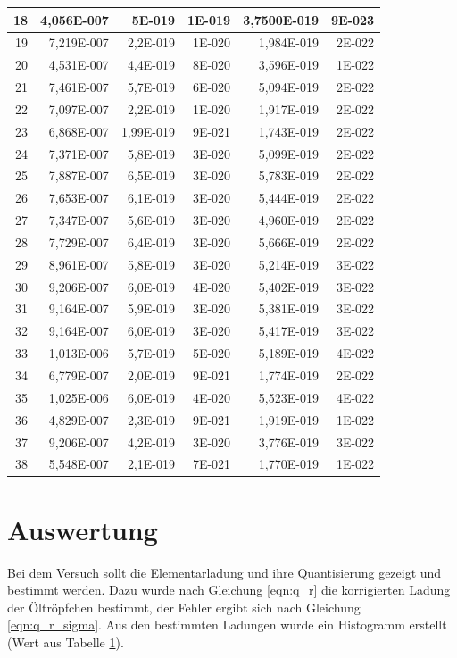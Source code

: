 \documentclass[12pt]{scrartcl}
\begin{document}
\begin{table}[H]
\begin{center}
\begin{tabular}{|r|r|r|r|r|r|}
18 & 4,056E-007 & 5E-019 & 1E-019 & 3,7500E-019 & 9E-023 \\ \hline
19 & 7,219E-007 & 2,2E-019 & 1E-020 & 1,984E-019 & 2E-022 \\ \hline
20 & 4,531E-007 & 4,4E-019 & 8E-020 & 3,596E-019 & 1E-022 \\ \hline
21 & 7,461E-007 & 5,7E-019 & 6E-020 & 5,094E-019 & 2E-022 \\ \hline
22 & 7,097E-007 & 2,2E-019 & 1E-020 & 1,917E-019 & 2E-022 \\ \hline
23 & 6,868E-007 & 1,99E-019 & 9E-021 & 1,743E-019 & 2E-022 \\ \hline
24 & 7,371E-007 & 5,8E-019 & 3E-020 & 5,099E-019 & 2E-022 \\ \hline
25 & 7,887E-007 & 6,5E-019 & 3E-020 & 5,783E-019 & 2E-022 \\ \hline
26 & 7,653E-007 & 6,1E-019 & 3E-020 & 5,444E-019 & 2E-022 \\ \hline
27 & 7,347E-007 & 5,6E-019 & 3E-020 & 4,960E-019 & 2E-022 \\ \hline
28 & 7,729E-007 & 6,4E-019 & 3E-020 & 5,666E-019 & 2E-022 \\ \hline
29 & 8,961E-007 & 5,8E-019 & 3E-020 & 5,214E-019 & 3E-022 \\ \hline
30 & 9,206E-007 & 6,0E-019 & 4E-020 & 5,402E-019 & 3E-022 \\ \hline
31 & 9,164E-007 & 5,9E-019 & 3E-020 & 5,381E-019 & 3E-022 \\ \hline
32 & 9,164E-007 & 6,0E-019 & 3E-020 & 5,417E-019 & 3E-022 \\ \hline
33 & 1,013E-006 & 5,7E-019 & 5E-020 & 5,189E-019 & 4E-022 \\ \hline
34 & 6,779E-007 & 2,0E-019 & 9E-021 & 1,774E-019 & 2E-022 \\ \hline
35 & 1,025E-006 & 6,0E-019 & 4E-020 & 5,523E-019 & 4E-022 \\ \hline
36 & 4,829E-007 & 2,3E-019 & 9E-021 & 1,919E-019 & 1E-022 \\ \hline
37 & 9,206E-007 & 4,2E-019 & 3E-020 & 3,776E-019 & 3E-022 \\ \hline
38 & 5,548E-007 & 2,1E-019 & 7E-021 & 1,770E-019 & 1E-022 \\ \hline
\end{tabular}
\end{center}
\label{tab:messwerte_3}
\end{table}


\section{Auswertung}
Bei dem Versuch sollt die Elementarladung und ihre Quantisierung gezeigt und bestimmt werden. Dazu wurde nach Gleichung \ref{eqn:q_r} die korrigierten Ladung der Öltröpfchen bestimmt, der Fehler ergibt sich nach Gleichung \ref{eqn:q_r_sigma}. Aus den bestimmten Ladungen wurde ein Histogramm erstellt (Wert aus Tabelle \ref{tab:messwerte_3}).
\end{document}
